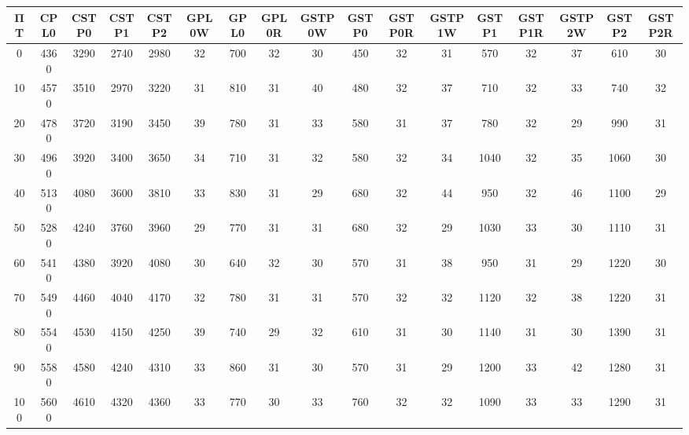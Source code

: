 \begin{tabular}{|c|c|c|c|c|c|c|c|c|c|c|c|c|c|c|c|c|}
\hline
ΠΤ&CPL0&CSTP0&CSTP1&CSTP2&GPL0W&GPL0&GPL0R&GSTP0W&GSTP0&GSTP0R&GSTP1W&GSTP1&GSTP1R&GSTP2W&GSTP2&GSTP2R\\\hline
\hline
0&4360&3290&2740&2980&32&700&32&30&450&32&31&570&32&37&610&30\\
\hline
10&4570&3510&2970&3220&31&810&31&40&480&32&37&710&32&33&740&32\\
\hline
20&4780&3720&3190&3450&39&780&31&33&580&31&37&780&32&29&990&31\\
\hline
30&4960&3920&3400&3650&34&710&31&32&580&32&34&1040&32&35&1060&30\\
\hline
40&5130&4080&3600&3810&33&830&31&29&680&32&44&950&32&46&1100&29\\
\hline
50&5280&4240&3760&3960&29&770&31&31&680&32&29&1030&33&30&1110&31\\
\hline
60&5410&4380&3920&4080&30&640&32&30&570&31&38&950&31&29&1220&30\\
\hline
70&5490&4460&4040&4170&32&780&31&31&570&32&32&1120&32&38&1220&31\\
\hline
80&5540&4530&4150&4250&39&740&29&32&610&31&30&1140&31&30&1390&31\\
\hline
90&5580&4580&4240&4310&33&860&31&30&570&31&29&1200&33&42&1280&31\\
\hline
100&5600&4610&4320&4360&33&770&30&33&760&32&32&1090&33&33&1290&31\\
\hline
\end{tabular}
